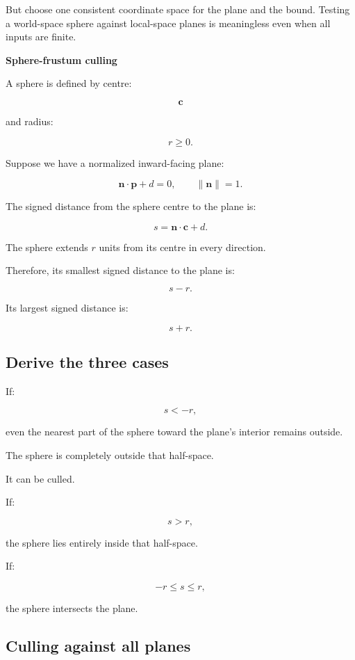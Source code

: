 But choose one consistent coordinate space for the plane and the bound. Testing a world-space sphere against local-space planes is meaningless even when all inputs are finite.

\textbf{Sphere-frustum culling}

A sphere is defined by centre:

\[
 \mathbf c
\]

and radius:

\[
 r\ge0.
\]

Suppose we have a normalized inward-facing plane:

\[
 \mathbf n\cdot\mathbf p+d=0, \qquad \|\mathbf n\|=1.
\]

The signed distance from the sphere centre to the plane is:

\[
 \boxed{ s=\mathbf n\cdot\mathbf c+d }.
\]

The sphere extends \(r\) units from its centre in every direction.

Therefore, its smallest signed distance to the plane is:

\[
 s-r.
\]

Its largest signed distance is:

\[
 s+r.
\]

\subsection{Derive the three cases}\label{02-foundations-ii-ch034-derive-the-three-cases}

If:

\[
 \boxed{s<-r},
\]

even the nearest part of the sphere toward the plane's interior remains outside.

The sphere is completely outside that half-space.

It can be culled.

If:

\[
 \boxed{s>r},
\]

the sphere lies entirely inside that half-space.

If:

\[
 \boxed{-r\le s\le r},
\]

the sphere intersects the plane.

\subsection{Culling against all planes}\label{02-foundations-ii-ch034-culling-against-all-planes}

